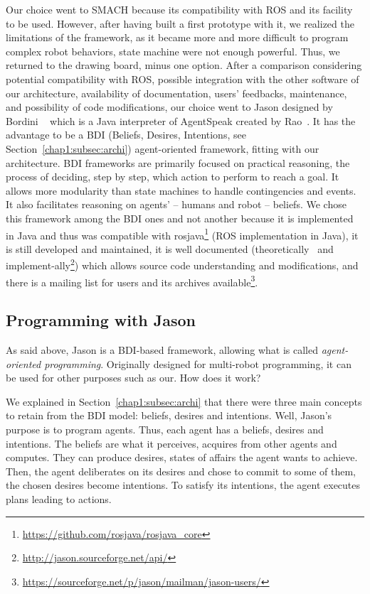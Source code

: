 \documentclass[a4paper,11pt,twoside]{StyleThese}
\begin{document}
Our choice went to SMACH because its compatibility with ROS and its facility to be used. However, after having built a first prototype with it, we realized the limitations of the framework, as it became more and more difficult to program complex robot behaviors, state machine were not enough powerful. Thus, we returned to the drawing board, minus one option. After a comparison considering potential compatibility with ROS, possible integration with the other software of our architecture, availability of documentation, users' feedbacks, maintenance, and possibility of code modifications, our choice went to Jason designed by Bordini \etal~\cite{bordini_2007_jason} which is a Java interpreter of AgentSpeak created by Rao~\cite{rao_1996_agentspeak}. It has the advantage to be a BDI (Beliefs, Desires, Intentions, see Section~\ref{chap1:subsec:archi}) agent-oriented framework, fitting with our architecture. BDI frameworks are primarily focused on practical reasoning, \ie the process of deciding, step by step, which action to perform to reach a goal. It allows more modularity than state machines to handle contingencies and events. It also facilitates reasoning on agents' -- humans and robot -- beliefs. We chose this framework among the BDI ones and not another because it is implemented in Java and thus was compatible with rosjava\footnote{\url{https://github.com/rosjava/rosjava_core}} (\ie ROS implementation in Java), it is still developed and maintained, it is well documented (theoretically~\cite{bordini_2007_jason} and implement-ally\footnote{\url{http://jason.sourceforge.net/api/}}) which allows source code understanding and modifications, and there is a mailing list for users and its archives available\footnote{\url{https://sourceforge.net/p/jason/mailman/jason-users/}}.

\subsection{Programming with Jason}\label{chap2:subsec:jason}
As said above, Jason is a BDI-based framework, allowing what is called \textit{agent-oriented programming}. Originally designed for multi-robot programming, it can be used for other purposes such as our. How does it work?

We explained in Section~\ref{chap1:subsec:archi} that there were three main concepts to retain from the BDI model: beliefs, desires and intentions. Well, Jason's purpose is to program agents. Thus, each agent has a beliefs, desires and intentions. The beliefs are what it perceives, acquires from other agents and computes. They can produce desires, \ie states of affairs the agent wants to achieve. Then, the agent deliberates on its desires and chose to commit to some of them, \ie the chosen desires become intentions. To satisfy its intentions, the agent executes plans leading to actions. 
\end{document}
